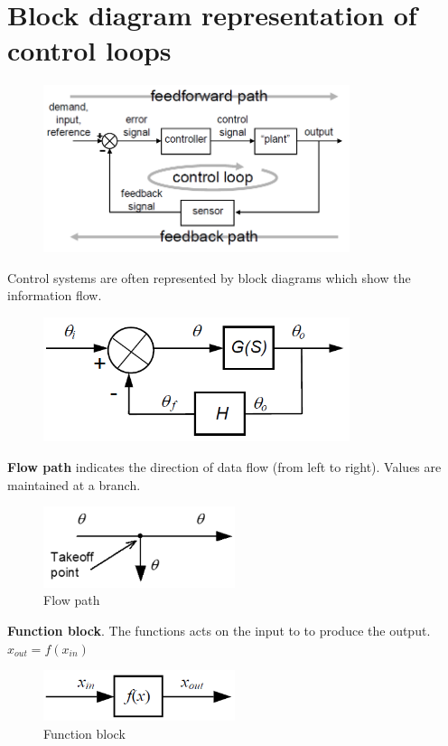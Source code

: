 \documentclass[class=report, crop=false, 12pt,a4paper]{standalone}
\begin{document}
\section{Block diagram representation of control loops}
\begin{figure}[H]
  \centering
  \includegraphics[width = 0.8\textwidth]{../img/blockdiagram1.png}
\end{figure}
Control systems are often represented by block diagrams which show the information flow.
\begin{figure}[H]
  \centering
  \includegraphics[width = 0.8\textwidth]{../img/blockdiagram2.png}
\end{figure}
\textbf{Flow path} indicates the direction of data flow (from left to right). Values are maintained at a branch.
\begin{figure}[H]
  \centering
  \includegraphics[width = 0.5\textwidth]{../img/flowpath.png}
  \caption{Flow path}
\end{figure}
\textbf{Function block}. The functions acts on the input to to produce the output. $x_{out} = f(x_{in})$
\begin{figure}[H]
  \centering
  \includegraphics[width = 0.5\textwidth]{../img/functionblock.png}
  \caption{Function block}
\end{figure}
\end{document}
